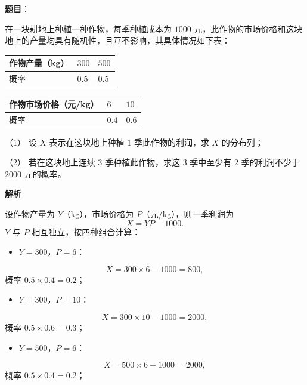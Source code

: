 \begin{answer}

\textbf{题目}：

在一块耕地上种植一种作物，每季种植成本为 $1000$ 元，此作物的市场价格和这块地上的产量均具有随机性，且互不影响，其具体情况如下表：

\begin{center}
\begin{tabular}{lll}
\toprule
作物产量（kg） & $300$ & $500$ \\
\midrule
概率 & $0.5$ & $0.5$ \\
\bottomrule
\end{tabular}
\end{center}

\begin{center}
\begin{tabular}{lll}
\toprule
作物市场价格（元/kg） & $6$ & $10$ \\
\midrule
概率 & $0.4$ & $0.6$ \\
\bottomrule
\end{tabular}
\end{center}

（1） 设 $X$ 表示在这块地上种植 $1$ 季此作物的利润，求 $X$ 的分布列；

（2） 若在这块地上连续 $3$ 季种植此作物，求这 $3$ 季中至少有 $2$ 季的利润不少于 $2000$ 元的概率。

\textbf{解析}


设作物产量为 $Y$（kg），市场价格为 $P$（元/kg），则一季利润为
\nopagebreak[4]
\[X=YP-1000.\]
$Y$ 与 $P$ 相互独立，按四种组合计算：

\begin{itemize}
\item $Y=300$，$P=6$：
\end{itemize}
\nopagebreak[4]
\[X=300\times6-1000=800,\]
概率 $0.5\times0.4=0.2$；

\begin{itemize}
\item $Y=300$，$P=10$：
\end{itemize}
\nopagebreak[4]
\[X=300\times10-1000=2000,\]
概率 $0.5\times0.6=0.3$；

\begin{itemize}
\item $Y=500$，$P=6$：
\end{itemize}
\nopagebreak[4]
\[X=500\times6-1000=2000,\]
概率 $0.5\times0.4=0.2$；


\end{answer}
